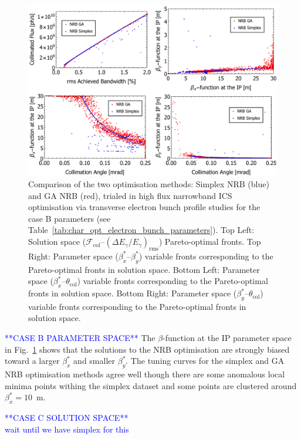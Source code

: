 \documentclass[../main.tex]{subfiles}
\begin{document}
\begin{figure}[!h]
\centering
\includegraphics[width=\textwidth]{Figures/Optimisation_and_Characterisation_of_Inverse_Compton_Scattering_Sources/CaseBoptcomp.pdf}
\caption{Comparison of the two optimisation methods: Simplex NRB (blue) and GA NRB (red), trialed in high flux narrowband ICS optimisation via transverse electron bunch profile studies for the case B parameters (see Table~\ref{tab:char_opt_electron_bunch_parameters}). Top Left: Solution space ($\mathcal{F}_{\mathrm{col}}$--$\left(\Delta E_{\gamma}/E_{\gamma}\right)_{\mathrm{rms}}$) Pareto-optimal fronts. Top Right: Parameter space ($\beta_{x}^{*}$--$\beta_{y}^{*}$) variable fronts corresponding to the Pareto-optimal fronts in solution space. Bottom Left: Parameter space ($\beta_{x}^{*}$--$\theta_{\mathrm{col}}$) variable fronts corresponding to the Pareto-optimal fronts in solution space. Bottom Right: Parameter space ($\beta_{y}^{*}$--$\theta_{\mathrm{col}}$) variable fronts corresponding to the Pareto-optimal fronts in solution space.}
\label{fig:case_B_optimisation_comparison)}
\end{figure}

\textcolor{blue}{**CASE B PARAMETER SPACE**}
The $\beta$-function at the IP parameter space in Fig.~\ref{fig:case_B_optimisation_comparison)} shows that the solutions to the NRB optimisation are strongly biased toward a larger $\beta_{x}^{*}$ and smaller $\beta_{y}^{*}$. The tuning curves for the simplex and GA NRB optimisation methods agree well though there are some anomalous local minima points withing the simplex dataset and some points are clustered around $\beta_{x}^{*} = 10$~\si{\meter}.

\textcolor{blue}{**CASE C SOLUTION SPACE** \\ wait until we have simplex for this}
\end{document}

